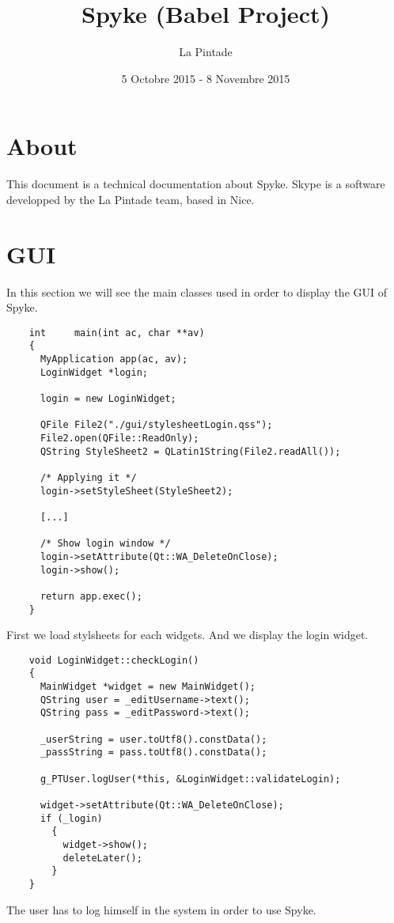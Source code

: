\documentclass{article}
\title{Spyke (Babel Project)}
\author{La Pintade}
\date{5 Octobre 2015 - 8 Novembre 2015}
\begin{document}
  \maketitle
  \tableofcontents


  \newpage
  \section{About}
    This document is a technical documentation about Spyke.
    Skype is a software developped by the La Pintade team, based in Nice.
  \newpage

  \section{GUI}
  In this section we will see the main classes used in order to display the GUI of Spyke.

  \begin{lstlisting}
    int		main(int ac, char **av)
    {
      MyApplication app(ac, av);
      LoginWidget *login;

      login = new LoginWidget;

      QFile File2("./gui/stylesheetLogin.qss");
      File2.open(QFile::ReadOnly);
      QString StyleSheet2 = QLatin1String(File2.readAll());

      /* Applying it */
      login->setStyleSheet(StyleSheet2);

      [...]

      /* Show login window */
      login->setAttribute(Qt::WA_DeleteOnClose);
      login->show();

      return app.exec();
    }
  \end{lstlisting}

  First we load stylsheets for each widgets. And we display the login widget.

  \begin{lstlisting}
    void LoginWidget::checkLogin()
    {
      MainWidget *widget = new MainWidget();
      QString user = _editUsername->text();
      QString pass = _editPassword->text();

      _userString = user.toUtf8().constData();
      _passString = pass.toUtf8().constData();

      g_PTUser.logUser(*this, &LoginWidget::validateLogin);

      widget->setAttribute(Qt::WA_DeleteOnClose);
      if (_login)
        {
          widget->show();
          deleteLater();
        }
    }

  \end{lstlisting}

  The user has to log himself in the system in order to use Spyke. 
\end{document}
